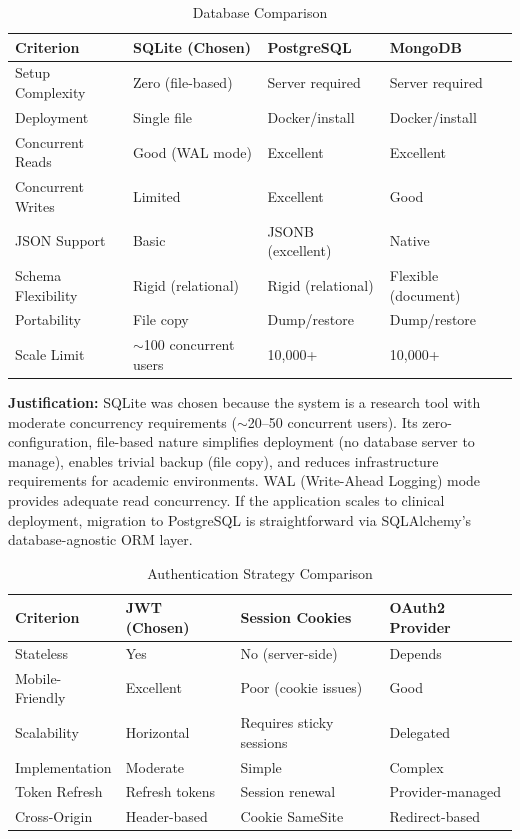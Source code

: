 \documentclass[12pt]{article}
\begin{document}
	\begin{table}[H]
		\centering
		\caption{Database Comparison}
		\small
		\begin{tabular}{|p{2.5cm}|p{2.5cm}|p{2.5cm}|p{2.5cm}|}
			\hline
			\textbf{Criterion} & \textbf{SQLite (Chosen)} & \textbf{PostgreSQL} & \textbf{MongoDB} \\ \hline
			Setup Complexity & Zero (file-based) & Server required & Server required \\ \hline
			Deployment & Single file & Docker/install & Docker/install \\ \hline
			Concurrent Reads & Good (WAL mode) & Excellent & Excellent \\ \hline
			Concurrent Writes & Limited & Excellent & Good \\ \hline
			JSON Support & Basic & JSONB (excellent) & Native \\ \hline
			Schema Flexibility & Rigid (relational) & Rigid (relational) & Flexible (document) \\ \hline
			Portability & File copy & Dump/restore & Dump/restore \\ \hline
			Scale Limit & $\sim$100 concurrent users & 10,000+ & 10,000+ \\ \hline
		\end{tabular}
	\end{table}

	\textbf{Justification:} SQLite was chosen because the system is a research tool with moderate concurrency requirements ($\sim$20--50 concurrent users). Its zero-configuration, file-based nature simplifies deployment (no database server to manage), enables trivial backup (file copy), and reduces infrastructure requirements for academic environments. WAL (Write-Ahead Logging) mode provides adequate read concurrency. If the application scales to clinical deployment, migration to PostgreSQL is straightforward via SQLAlchemy's database-agnostic ORM layer.

	\begin{table}[H]
		\centering
		\caption{Authentication Strategy Comparison}
		\small
		\begin{tabular}{|p{2.5cm}|p{2.5cm}|p{2.5cm}|p{2.5cm}|}
			\hline
			\textbf{Criterion} & \textbf{JWT (Chosen)} & \textbf{Session Cookies} & \textbf{OAuth2 Provider} \\ \hline
			Stateless & Yes & No (server-side) & Depends \\ \hline
			Mobile-Friendly & Excellent & Poor (cookie issues) & Good \\ \hline
			Scalability & Horizontal & Requires sticky sessions & Delegated \\ \hline
			Implementation & Moderate & Simple & Complex \\ \hline
			Token Refresh & Refresh tokens & Session renewal & Provider-managed \\ \hline
			Cross-Origin & Header-based & Cookie SameSite & Redirect-based \\ \hline
		\end{tabular}
	\end{table}
\end{document}
